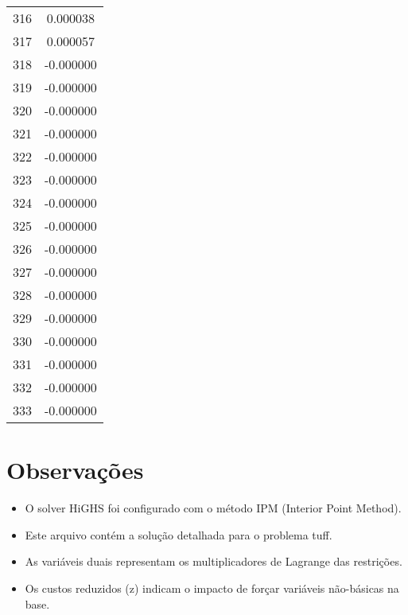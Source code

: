 \documentclass[12pt]{article}
\begin{document}
\begin{longtable}{@{}cc@{}}
316 & 0.000038 \\
317 & 0.000057 \\
318 & -0.000000 \\
319 & -0.000000 \\
320 & -0.000000 \\
321 & -0.000000 \\
322 & -0.000000 \\
323 & -0.000000 \\
324 & -0.000000 \\
325 & -0.000000 \\
326 & -0.000000 \\
327 & -0.000000 \\
328 & -0.000000 \\
329 & -0.000000 \\
330 & -0.000000 \\
331 & -0.000000 \\
332 & -0.000000 \\
333 & -0.000000 \\

\end{longtable}


\section{Observações}

\begin{itemize}
\item O solver HiGHS foi configurado com o método IPM (Interior Point Method).
\item Este arquivo contém a solução detalhada para o problema tuff.
\item As variáveis duais representam os multiplicadores de Lagrange das restrições.
\item Os custos reduzidos (z) indicam o impacto de forçar variáveis não-básicas na base.
\end{itemize}
\end{document}

